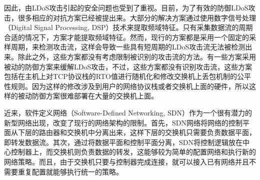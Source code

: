 因此，由LDoS攻击引起的安全问题也受到了重视。目前，为了有效的防御LDoS攻击，很多相应的对抗方案已经被提出来。大部分的解决方案\cite{b1,b4, b6, b7, b22}通过使用数字信号处理（Digital Signal Processing, DSP）技术来提取频域特征。只有采集数据流的周期合适的情况下，方案才能提取频域特征。然而，现行的方案都是采用一个固定的采样周期，来检测攻击流，这样会导致一些具有短周期的LDoS攻击流无法被检测出来。除此之外，这些方案都没有考虑限制被识别的攻击流的方法。有一些方案采用被动的防御方案来缓解LDoS攻击，不过，这些方案都没有识别攻击流，这些方案包括在主机上对TCP协议栈的RTO值进行随机化\cite{b17}和修改交换机上丢包机制的公平性规则\cite{b8}。因为这样的修改涉及到用户的网络协议栈或者交换机上面的硬件，所以这样的被动防御方案很难部署在大量的交换机上面。

近来，软件定义网络（Software-Defined Networking, SDN）作为一个很有潜力的新型网络出现，改变了现行的网络架构的限制。首先，SDN网络将网络的控制平面从下层的路由器和交换机中分离出来，这样下层的交换机只需要负责数据平面，即转发数据流。其次，通过将数据平面和控制平面分离，SDN将控制逻辑放在中心控制器上，而交换机则负责数据的转发，这能够较为简单的配置网络和执行新的网络策略。而且，由于交换机只要与控制器完成连接，就可以接入已有网络并且不需要重复配置就能够执行统一的策略。




